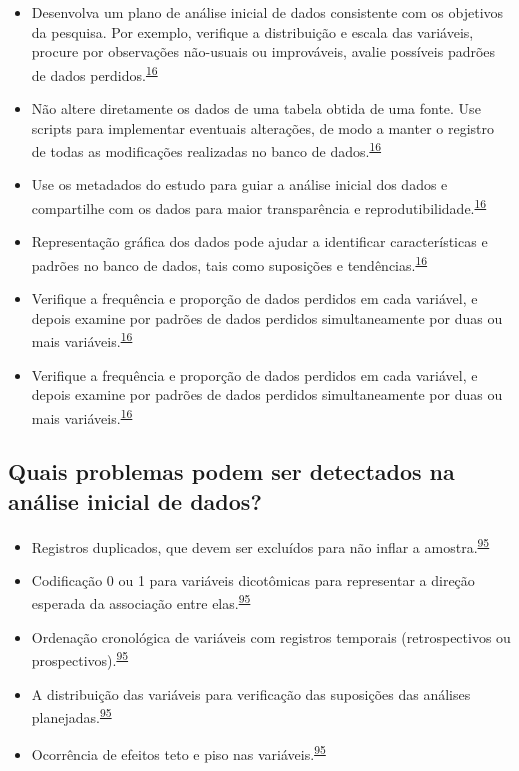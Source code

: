 \documentclass[
]{book}
\begin{document}
\begin{itemize}
\item
  Desenvolva um plano de análise inicial de dados consistente com os objetivos da pesquisa. Por exemplo, verifique a distribuição e escala das variáveis, procure por observações não-usuais ou improváveis, avalie possíveis padrões de dados perdidos.\textsuperscript{\protect\hyperlink{ref-Baillie2022}{16}}
\item
  Não altere diretamente os dados de uma tabela obtida de uma fonte. Use scripts para implementar eventuais alterações, de modo a manter o registro de todas as modificações realizadas no banco de dados.\textsuperscript{\protect\hyperlink{ref-Baillie2022}{16}}
\item
  Use os metadados do estudo para guiar a análise inicial dos dados e compartilhe com os dados para maior transparência e reprodutibilidade.\textsuperscript{\protect\hyperlink{ref-Baillie2022}{16}}
\item
  Representação gráfica dos dados pode ajudar a identificar características e padrões no banco de dados, tais como suposições e tendências.\textsuperscript{\protect\hyperlink{ref-Baillie2022}{16}}
\item
  Verifique a frequência e proporção de dados perdidos em cada variável, e depois examine por padrões de dados perdidos simultaneamente por duas ou mais variáveis.\textsuperscript{\protect\hyperlink{ref-Baillie2022}{16}}
\item
  Verifique a frequência e proporção de dados perdidos em cada variável, e depois examine por padrões de dados perdidos simultaneamente por duas ou mais variáveis.\textsuperscript{\protect\hyperlink{ref-Baillie2022}{16}}
\end{itemize}

\hypertarget{quais-problemas-podem-ser-detectados-na-anuxe1lise-inicial-de-dados}{%
\subsection{Quais problemas podem ser detectados na análise inicial de dados?}\label{quais-problemas-podem-ser-detectados-na-anuxe1lise-inicial-de-dados}}

\begin{itemize}
\item
  Registros duplicados, que devem ser excluídos para não inflar a amostra.\textsuperscript{\protect\hyperlink{ref-huebner2016}{95}}
\item
  Codificação 0 ou 1 para variáveis dicotômicas para representar a direção esperada da associação entre elas.\textsuperscript{\protect\hyperlink{ref-huebner2016}{95}}
\item
  Ordenação cronológica de variáveis com registros temporais (retrospectivos ou prospectivos).\textsuperscript{\protect\hyperlink{ref-huebner2016}{95}}
\item
  A distribuição das variáveis para verificação das suposições das análises planejadas.\textsuperscript{\protect\hyperlink{ref-huebner2016}{95}}
\item
  Ocorrência de efeitos teto e piso nas variáveis.\textsuperscript{\protect\hyperlink{ref-huebner2016}{95}}
\end{itemize}
\end{document}
